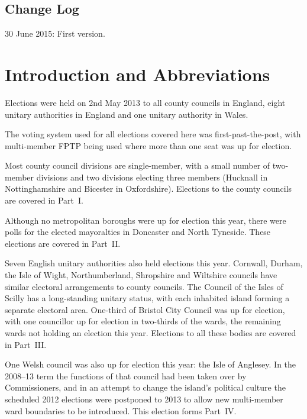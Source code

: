 \documentclass[a4paper,openany,10pt]{book}
\begin{document}
\section*{Change Log}

30 June 2015: First version.

\tableofcontents


\chapter*{Introduction and Abbreviations}


Elections were held on 2nd May 2013 to all county councils in England, eight unitary authorities in England and one unitary authority in Wales.

The voting system used for all elections covered here was
first-past-the-post, with multi-member FPTP being used where more than
one seat was up for election.  

Most county council divisions are single-member, with a small number of two-member divisions and two divisions electing three members (Hucknall in Nottinghamshire and Bicester in Oxfordshire).  Elections to the county councils are covered in Part~I.

Although no metropolitan boroughs were up for election this year, there were polls for the elected mayoralties in Doncaster and North Tyneside.  These elections are covered in Part~II.

Seven English unitary authorities also held elections this year.  Cornwall, Durham, the Isle of Wight, Northumberland, Shropshire and Wiltshire councils have similar electoral arrangements to county councils.  The Council of the Isles of Scilly has a long-standing unitary status, with each inhabited island forming a separate electoral area.  One-third of Bristol City Council was up for election, with one councillor up for election in two-thirds of the wards, the remaining wards not holding an election this year.  Elections to all these bodies are covered in Part~III.

One Welsh council was also up for election this year: the Isle of Anglesey.  In the 2008--13 term the functions of that council had been taken over by Commissioners, and in an attempt to change the island's political culture the scheduled 2012 elections were postponed to 2013 to allow new multi-member ward boundaries to be introduced.   This election forms Part~IV.
\end{document}
